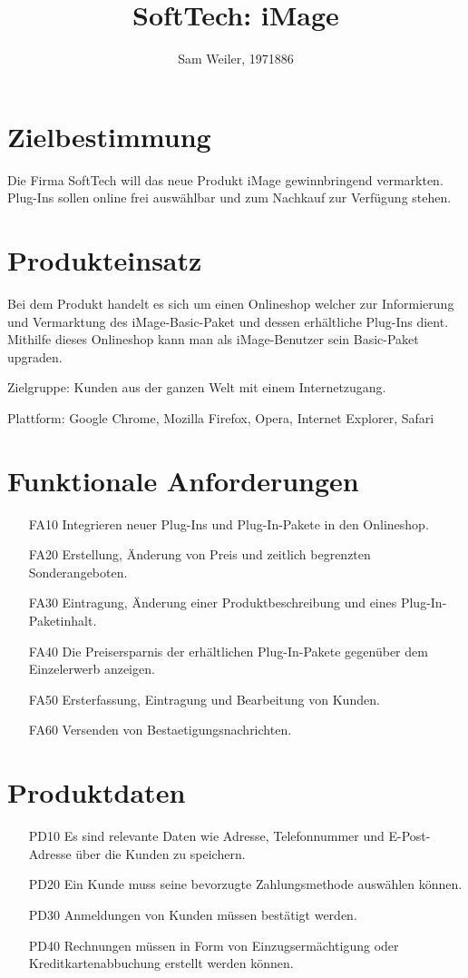 \documentclass[parskip=full]{scrartcl}
\title{SoftTech: \gls{iMage}}
\author{Sam Weiler, 1971886}
\begin{document}
\maketitle

\section{Zielbestimmung}
Die Firma SoftTech will das neue Produkt \gls{iMage} gewinnbringend vermarkten. \gls{Plug-In}s sollen online frei auswählbar und zum Nachkauf zur Verfügung stehen.

\section{Produkteinsatz}
Bei dem Produkt handelt es sich um einen \gls{Onlineshop} welcher zur Informierung und Vermarktung des \gls{iMage}-Basic-Paket und dessen erhältliche \gls{Plug-In}s dient. Mithilfe dieses \gls{Onlineshop} kann man als \gls{iMage}-Benutzer sein Basic-Paket \gls{upgraden}.

Zielgruppe: \gls{Kunde}n aus der ganzen Welt mit einem Internetzugang.

Plattform: \gls{Google Chrome}, \gls{Mozilla Firefox}, \gls{Opera}, \gls{Internet Explorer}, \gls{Safari}

\section{Funktionale Anforderungen}
\begin{itemize}[nosep]
\item[FA10] Integrieren neuer \gls{Plug-In}s und \gls{Plug-In}-Pakete in den \gls{Onlineshop}.
\item[FA20] Erstellung, Änderung von Preis und zeitlich begrenzten \gls{Sonderangebot}en.
\item[FA30] Eintragung, Änderung einer Produktbeschreibung und eines \gls{Plug-In}-Paketinhalt.
\item[FA40] Die Preisersparnis der erhältlichen \gls{Plug-In}-Pakete gegenüber dem Einzelerwerb anzeigen.
\item[FA50] Ersterfassung, Eintragung und Bearbeitung von \gls{Kunde}n.
\item[FA60] Versenden von \gls{Bestaetigungsnachricht}en.
\end{itemize}

\section{Produktdaten}
\begin{itemize}[nosep]
\item[PD10] Es sind relevante Daten wie Adresse, Telefonnummer und E-Post-Adresse über die \gls{Kunde}n zu speichern.
\item[PD20] Ein \gls{Kunde} muss seine bevorzugte Zahlungsmethode auswählen können.
\item[PD30] Anmeldungen von \gls{Kunde}n müssen bestätigt werden.
\item[PD40] Rechnungen müssen in Form von Einzugsermächtigung oder Kreditkartenabbuchung erstellt werden können.
\end{itemize}
\end{document}

